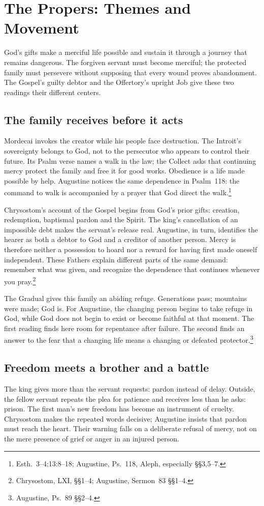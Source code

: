 \section{The Propers: Themes and Movement}
God's gifts make a merciful life possible and sustain it through a journey that remains dangerous. The forgiven servant must become merciful; the protected family must persevere without supposing that every wound proves abandonment. The Gospel's guilty debtor and the Offertory's upright Job give these two readings their different centers.

\subsection{The family receives before it acts}
Mordecai invokes the creator while his people face destruction. The Introit's sovereignty belongs to God, not to the persecutor who appears to control their future. Its Psalm verse names a walk in the law; the Collect asks that continuing mercy protect the family and free it for good works. Obedience is a life made possible by help. Augustine notices the same dependence in Psalm~118: the command to walk is accompanied by a prayer that God direct the walk.\footnote{Esth.~3--4;13:8--18; Augustine, Ps.~118, Aleph, especially \S\S3,5--7.}

Chrysostom's account of the Gospel begins from God's prior gifts: creation, redemption, baptismal pardon and the Spirit. The king's cancellation of an impossible debt makes the servant's release real. Augustine, in turn, identifies the hearer as both a debtor to God and a creditor of another person. Mercy is therefore neither a possession to hoard nor a reward for having first made oneself independent. These Fathers explain different parts of the same demand: remember what was given, and recognize the dependence that continues whenever you pray.\footnote{Chrysostom,  LXI, \S\S1--4; Augustine, Sermon~83 \S\S1--4.}

The Gradual gives this family an abiding refuge. Generations pass; mountains were made; God is. For Augustine, the changing person begins to take refuge in God, while God does not begin to exist or become faithful at that moment. The first reading finds here room for repentance after failure. The second finds an answer to the fear that a changing life means a changing or defeated protector.\footnote{Augustine, Ps.~89 \S\S2--4.}

\subsection{Freedom meets a brother and a battle}
The king gives more than the servant requests: pardon instead of delay. Outside, the fellow servant repeats the plea for patience and receives less than he asks: prison. The first man's new freedom has become an instrument of cruelty. Chrysostom makes the repeated words decisive; Augustine insists that pardon must reach the heart. Their warning falls on a deliberate refusal of mercy, not on the mere presence of grief or anger in an injured person.

